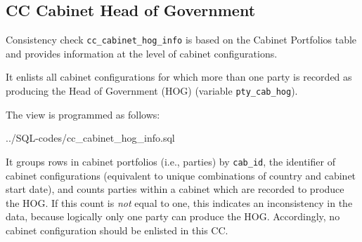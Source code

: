 \subsection{CC Cabinet Head of Government}\label{cc_cabinet_hog_info}
Consistency check \texttt{\footnotesize cc\_cabinet\_hog\_info} is based on the Cabinet Portfolios table and provides information at the level of cabinet configurations.

It enlists all cabinet configurations for which more than one party is recorded as producing the Head of Government (HOG) (variable \texttt{\footnotesize pty\_cab\_hog}).

The view is programmed as follows:

%
{../SQL-codes/cc_cabinet_hog_info.sql}

It groups rows in cabinet portfolios (i.e., parties) by \texttt{\footnotesize cab\_id}, the identifier of cabinet configurations (equivalent to unique combinations of country and cabinet start date), and counts parties within a cabinet  which are recorded to produce the HOG. 
If this count is \emph{not} equal to one, this indicates an inconsistency in the data, because logically only one party can produce the HOG.
Accordingly, no cabinet configuration should be enlisted in this CC.

